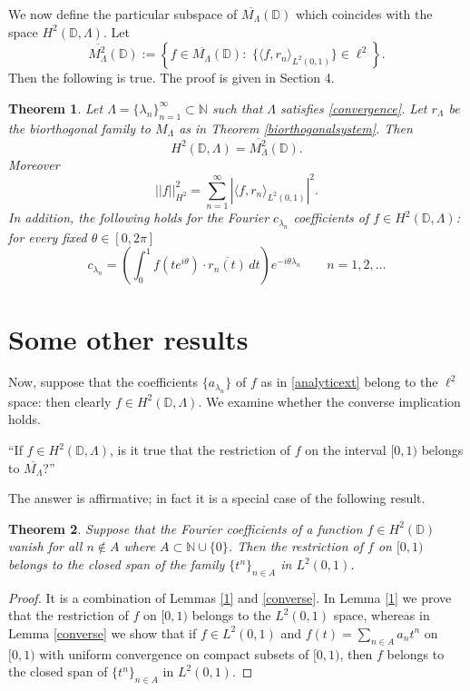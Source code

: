 \documentclass[11pt, a4paper]{article}
\newtheorem{theorem}{Theorem}[section]
\begin{document}
We now define the particular subspace of $\overline{M_{\Lambda}}(\mathbb{D})$ which coincides with the space
$H^2(\mathbb{D}, \Lambda)$.
Let
\[
\overline{M^2_{\Lambda}}(\mathbb{D}):=\left\{f\in \overline{M_{\Lambda}}(\mathbb{D}):\,\,
\{\langle f, r_n\rangle_{L^2 (0,1)}\}\in \ell^2\right\}.
\]
Then the following is true. The proof is given in Section 4.
\begin{theorem}\label{HS}
Let $\Lambda=\{\lambda_n\}_{n=1}^{\infty}\subset\mathbb{N}$ such that $\Lambda$
satisfies \eqref{convergence}.
Let $r_{\Lambda}$ be the biorthogonal family to $M_{\Lambda}$ as in Theorem \ref{biorthogonalsystem}.
Then
\begin{equation}\label{equivalence}
H^2(\mathbb{D}, \Lambda)=\overline{M^2_{\Lambda}}(\mathbb{D}).
\end{equation}
Moreover
\begin{equation}\label{norms}
||f||_{H^2}^2=\sum_{n=1}^{\infty}\left| \langle f, r_n\rangle_{L^2 (0,1)} \right|^2.
\end{equation}
In addition, the following holds for the Fourier $c_{\lambda_n}$ coefficients of $f\in H^2 (\mathbb{D}, \Lambda)$: for every fixed $\theta\in [0,2\pi]$
\begin{equation}\label{coeff}
c_{\lambda_n}=\left(\int_{0}^{1} f(te^{i\theta})\cdot \overline{r_n(t)}\, dt\right)e^{-i\theta\lambda_n}\qquad n=1,2,\dots
\end{equation}
\end{theorem}


\section{Some other results}
\setcounter{equation}{0}

Now, suppose that the coefficients $\{a_{\lambda_n}\}$ of $f$ as in \eqref{analyticext} belong to the $\ell^2$ space: then
clearly $f\in H^2 (\mathbb{D}, \Lambda)$. We examine whether the converse implication holds.

``If $f\in H^2 (\mathbb{D}, \Lambda)$, is it true that the restriction of $f$ on the interval $[0,1)$ belongs to $\overline{M_{\Lambda}}$?''

The answer is affirmative; in fact it is a special case of the following result.
\begin{theorem}\label{first}
Suppose that the Fourier coefficients of a function $f\in H^2 (\mathbb{D})$ vanish for all $n\notin A$ where $A\subset \mathbb{N}\cup\{0\}$.
Then the restriction of $f$ on $[0,1)$ belongs to the closed span of the family $\{t^n\}_{n\in A}$ in $L^2 (0,1)$.
\end{theorem}
\begin{proof}
It is a combination of Lemmas \ref{1} and \ref{converse}. In Lemma \ref{1} we prove that the restriction of $f$ on $[0,1)$ belongs to the $L^2 (0,1)$ space, whereas in Lemma \ref{converse} we show that if $f\in L^2 (0,1)$ and  $f(t)=\sum_{n\in A}a_n t^n$ on $[0,1)$ with uniform convergence on compact subsets of $[0,1)$, then $f$ belongs to the closed span of $\{t^n\}_{n\in A}$ in $L^2 (0,1)$.
\end{proof}
\end{document}
